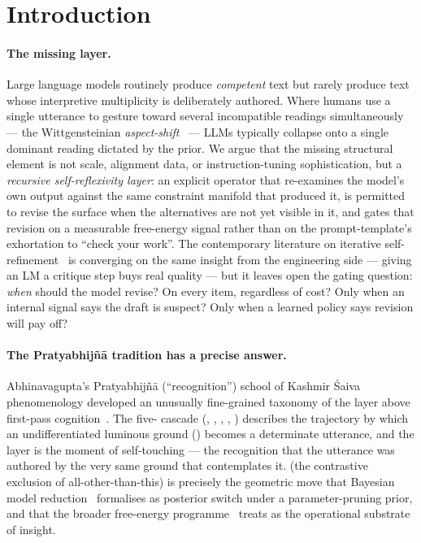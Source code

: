 \section{Introduction}\label{sec:intro}

\paragraph{The missing layer.} Large language models routinely produce \emph{competent} text but rarely produce text whose interpretive multiplicity is deliberately authored. Where humans use a single utterance to gesture toward several incompatible readings simultaneously --- the Wittgensteinian \emph{aspect-shift}~\citep{WittgensteinPI} --- LLMs typically collapse onto a single dominant reading dictated by the prior. We argue that the missing structural element is not scale, alignment data, or instruction-tuning sophistication, but a \emph{recursive self-reflexivity layer}: an explicit operator that re-examines the model's own output against the same constraint manifold that produced it, is permitted to revise the surface when the alternatives are not yet visible in it, and gates that revision on a measurable free-energy signal rather than on the prompt-template's exhortation to ``check your work''. The contemporary literature on iterative self-refinement~\citep{MadaanEtAl2023SelfRefineNeurIPS,ShinnEtAl2023Reflexion,BaiEtAl2022ConstitutionalAI} is converging on the same insight from the engineering side --- giving an LM a critique step buys real quality --- but it leaves open the gating question: \emph{when} should the model revise? On every item, regardless of cost? Only when an internal signal says the draft is suspect? Only when a learned policy says revision will pay off?

\paragraph{The Pratyabhij\~n\=a tradition has a precise answer.} Abhinavagupta's Pratyabhij\~n\=a (``recognition'') school of Kashmir \'Saiva phenomenology developed an unusually fine-grained taxonomy of the layer above first-pass cognition~\citep{Lawrence1996TantricArgumentPEW,abhinavagupta-isvarapratyabhijna,pratyabhijnahrdayam-singh}. The five- cascade (, , , , ) describes the trajectory by which an undifferentiated luminous ground () becomes a determinate utterance, and the  layer is the moment of self-touching --- the recognition that the utterance was authored by the very same ground that contemplates it.  (the contrastive exclusion of all-other-than-this) is precisely the geometric move that Bayesian model reduction~\citep{Friston2018BayesianModelReductionArxiv,FristonPenny2011,FristonEtAl2016BayesianModelReductionEmpiricalBayesDCM} formalises as posterior switch under a parameter-pruning prior, and that the broader free-energy programme~\citep{Friston2010FreeEnergyUnifiedBrainTheory,Friston2017ActiveInferenceCuriosity,Friston2013LifeAsWeKnowItJRSAInterface,Heins2022pymdp} treats as the operational substrate of insight.

